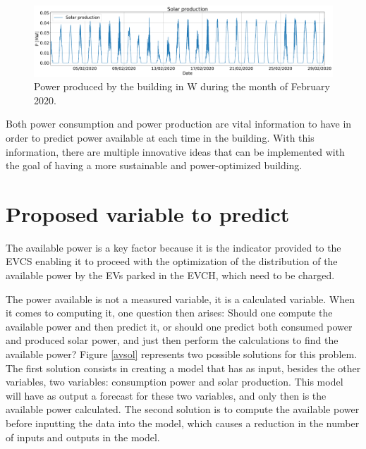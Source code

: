 \begin{figure}[h!]
    \centering
    \begin{center}
    \includegraphics[width=1\textwidth]{Images/power_production.png}
    \caption{Power produced by the building in W during the month of February 2020.}
    \label{production}
    \end{center}
\end{figure}


Both power consumption and power production are vital information to have in order to predict power available at each time in the building. With this information, there are multiple innovative ideas that can be implemented with the goal of having a more sustainable and power-optimized building.

\section{Proposed variable to predict}\label{chap3:sec:variable_to_predict}

The available power is a key factor because it is the indicator provided to the \ac{EVCS} enabling it to proceed with the optimization of the distribution of the available power by the \ac{EV}s parked in the \ac{EVCH}, which need to be charged.

The power available is not a measured variable, it is a calculated variable. When it comes to computing it, one question then arises: Should one compute the available power and then predict it, or should one predict both consumed power and produced solar power, and just then perform the calculations to find the available power? Figure \ref{avsol} represents two possible solutions for this problem. The first solution consists in creating a model that has as input, besides the other variables, two variables: consumption power and solar production. This model will have as output a forecast for these two variables, and only then is the available power calculated. The second solution is to compute the available power before inputting the data into the model, which causes a reduction in the number of inputs and outputs in the model. 

